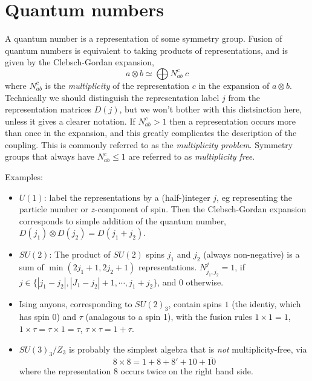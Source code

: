 \documentclass[12pt]{article}
\begin{document}
\section{Quantum numbers}

A quantum number is a representation of some symmetry group. Fusion of quantum
numbers is equivalent to taking products of representations, and is given by
the Clebsch-Gordan expansion,
\begin{equation}
a \otimes b \simeq \bigoplus N^{c}_{ab} \: c
\end{equation}
where $N^{c}_{ab}$ is the \emph{multiplicity} of the representation $c$ in the expansion
of $a \otimes b$.
Technically we should distinguish the representation label $j$ from the representation
matrices $D(j)$, but we won't bother with this distsinction here, unless it gives a clearer
notation.
If $N^{c}_{ab} > 1$ then a representation occurs more than once in the expansion,
and this greatly complicates the description of the coupling. This is commonly
referred to as the \emph{multiplicity problem}. Symmetry groups that always have 
$N^{c}_{ab} \leq 1$ are referred to as \emph{multiplicity free}.

Examples:
\begin{itemize}
\item $U(1)$: label the representations by a (half-)integer $j$, eg representing
the particle number or $z$-component of spin. Then the Clebsch-Gordan
expansion corresponds to simple addition of the quantum number, $D(j_1) \otimes D(j_2) = D(j_1+j_2)$.
\item $SU(2)$: The product of $SU(2)$ spins $j_1$ and $j_2$ (always non-negative) 
is a sum of $\min(2j_1+1,2j_2+1)$
representations. $N^{j}_{j_1,j_2} = 1$, if 
$j \in \{|j_1 - j_2|, |J_1 - j_2| + 1, \cdots, j_1+j_2\}$,
and $0$ otherwise.
\item Ising anyons, corresponding to $SU(2)_3$, contain spins $1$ (the identiy,
which has spin 0) and $\tau$ (analagous to a spin 1), with the
fusion rules $1 \times 1 = 1$, $1 \times \tau = \tau \times 1 = \tau$, $\tau \times \tau = 1 + \tau$.
\item $SU(3)_3 / Z_3$ is probably the simplest algebra that is \emph{not} 
multiplicity-free\cite{Ardonne}, via
\begin{equation}
8 \times 8 = 1 + 8 + 8' + 10 + \bar{10}
\end{equation}
where the representation $8$ occurs twice on the right hand side.

\end{itemize}
\end{document}
